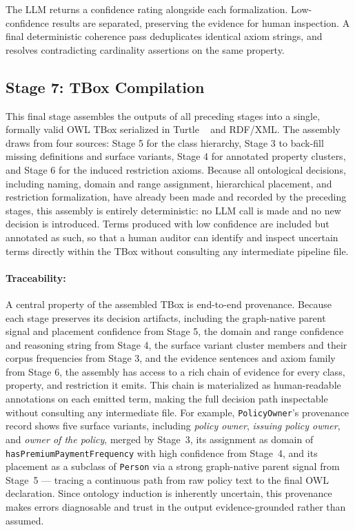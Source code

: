 \documentclass[sigconf]{acmart}
\begin{document}
The LLM returns a confidence rating alongside each formalization. Low-confidence results are separated, preserving the evidence for human inspection. A final deterministic coherence pass deduplicates identical axiom strings, and resolves contradicting cardinality
assertions on the same property.




\subsection*{Stage 7: TBox Compilation}

This final stage assembles the outputs of all preceding stages into a single, formally valid OWL TBox serialized in Turtle ~\cite{beckett2014rdf} and RDF/XML. The assembly draws from four sources: Stage 5 for the class hierarchy, Stage 3 to back-fill missing definitions and surface variants, Stage 4 for annotated property clusters, and Stage 6 for the induced restriction axioms.
Because all ontological decisions, including naming, domain and range assignment, hierarchical placement, and restriction formalization, have already been made and recorded by the preceding stages, this assembly is entirely deterministic: no LLM call is made and no new decision is introduced. Terms produced with low confidence are included but annotated as such, so that a human auditor can identify and inspect uncertain terms
directly within the TBox without consulting any intermediate pipeline file.

\paragraph{\textbf{Traceability:}}
A central property of the assembled TBox is end-to-end provenance.
Because each stage preserves its decision artifacts, including the
graph-native parent signal and placement confidence from Stage 5,
the domain and range confidence and reasoning string from Stage 4,
the surface variant cluster members and their corpus frequencies from
Stage 3, and the evidence sentences and axiom family from Stage 6,
the assembly has access to a rich chain of evidence for every class,
property, and restriction it emits.
This chain is materialized as human-readable annotations on each
emitted term, making the full decision path inspectable without
consulting any intermediate file.
For example, \texttt{PolicyOwner}'s provenance record shows five surface variants, including \textit{policy owner}, \textit{issuing policy owner}, and \textit{owner of the policy}, merged by Stage~3, its assignment as domain of \texttt{hasPremiumPaymentFrequency} with high confidence from Stage~4, and its placement as a subclass of \texttt{Person} via a strong graph-native parent signal from Stage~5 --- tracing a continuous path from raw policy text to the final OWL declaration. Since ontology induction is inherently uncertain, this provenance makes errors diagnosable and trust in the output evidence-grounded rather than assumed.
\end{document}
